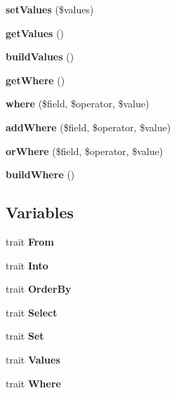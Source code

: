 \begin{DoxyCompactItemize}
\item 
{\bfseries set\+Values} (\$values)\hypertarget{namespaceORM_1_1QueryBuilder_1_1Clause_a6230ac3362f24811a6d3b92d0a844abd}{}\label{namespaceORM_1_1QueryBuilder_1_1Clause_a6230ac3362f24811a6d3b92d0a844abd}

\item 
{\bfseries get\+Values} ()\hypertarget{namespaceORM_1_1QueryBuilder_1_1Clause_aa66af4e35724b5c8990b60f751a1cce8}{}\label{namespaceORM_1_1QueryBuilder_1_1Clause_aa66af4e35724b5c8990b60f751a1cce8}

\item 
{\bfseries build\+Values} ()\hypertarget{namespaceORM_1_1QueryBuilder_1_1Clause_a8b225a0d6ad3df3455d2e11ca120f0ff}{}\label{namespaceORM_1_1QueryBuilder_1_1Clause_a8b225a0d6ad3df3455d2e11ca120f0ff}

\item 
{\bfseries get\+Where} ()\hypertarget{namespaceORM_1_1QueryBuilder_1_1Clause_a19d0b2e43826fc95f3e693c042fee30b}{}\label{namespaceORM_1_1QueryBuilder_1_1Clause_a19d0b2e43826fc95f3e693c042fee30b}

\item 
{\bfseries where} (\$field, \$operator, \$value)\hypertarget{namespaceORM_1_1QueryBuilder_1_1Clause_a986edb010bf65dfd4797636565d64d01}{}\label{namespaceORM_1_1QueryBuilder_1_1Clause_a986edb010bf65dfd4797636565d64d01}

\item 
{\bfseries add\+Where} (\$field, \$operator, \$value)\hypertarget{namespaceORM_1_1QueryBuilder_1_1Clause_a7b9ec91cf6ee170dfc5e94461241b227}{}\label{namespaceORM_1_1QueryBuilder_1_1Clause_a7b9ec91cf6ee170dfc5e94461241b227}

\item 
{\bfseries or\+Where} (\$field, \$operator, \$value)\hypertarget{namespaceORM_1_1QueryBuilder_1_1Clause_a0a803d2acf9dd0457f535bdea70f0f55}{}\label{namespaceORM_1_1QueryBuilder_1_1Clause_a0a803d2acf9dd0457f535bdea70f0f55}

\item 
{\bfseries build\+Where} ()\hypertarget{namespaceORM_1_1QueryBuilder_1_1Clause_a7ffd3f1014fdb2a6ce7ccb923082bad6}{}\label{namespaceORM_1_1QueryBuilder_1_1Clause_a7ffd3f1014fdb2a6ce7ccb923082bad6}

\end{DoxyCompactItemize}
\subsection*{Variables}
\begin{DoxyCompactItemize}
\item 
trait {\bfseries From}
\item 
trait {\bfseries Into}
\item 
trait {\bfseries Order\+By}
\item 
trait {\bfseries Select}
\item 
trait {\bfseries Set}
\item 
trait {\bfseries Values}
\item 
trait {\bfseries Where}
\end{DoxyCompactItemize}


